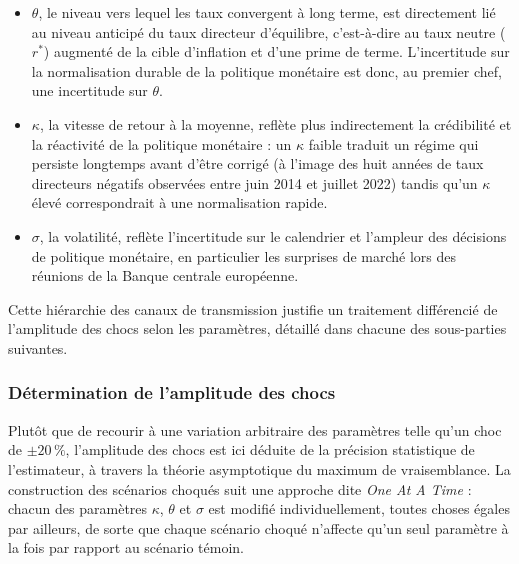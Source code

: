 \begin{itemize}
    \item $\theta$, le niveau vers lequel les taux convergent à long terme, est directement lié au niveau anticipé du taux directeur d'équilibre, c'est-à-dire au taux neutre ($r^*$) augmenté de la cible d'inflation et d'une prime de terme. L'incertitude sur la normalisation durable de la politique monétaire est donc, au premier chef, une incertitude sur $\theta$.
    \item $\kappa$, la vitesse de retour à la moyenne, reflète plus indirectement la crédibilité et la réactivité de la politique monétaire : un $\kappa$ faible traduit un régime qui persiste longtemps avant d'être corrigé (à l'image des huit années de taux directeurs négatifs observées entre juin 2014 et juillet 2022) tandis qu'un $\kappa$ élevé correspondrait à une normalisation rapide.
    \item $\sigma$, la volatilité, reflète l'incertitude sur le calendrier et l'ampleur des décisions de politique monétaire, en particulier les surprises de marché lors des réunions de la Banque centrale européenne.
\end{itemize}

Cette hiérarchie des canaux de transmission justifie un traitement différencié de l'amplitude des chocs selon les paramètres, détaillé dans chacune des sous-parties suivantes.

\subsubsection*{Détermination de l'amplitude des chocs}

Plutôt que de recourir à une variation arbitraire des paramètres telle qu'un choc de $\pm 20\,\%$, l'amplitude des chocs est ici déduite de la précision statistique de l'estimateur, à travers la théorie asymptotique du maximum de vraisemblance. La construction des scénarios choqués suit une approche dite \textit{One At A Time} : chacun des paramètres $\kappa$, $\theta$ et $\sigma$ est modifié individuellement, toutes choses égales par ailleurs, de sorte que chaque scénario choqué n'affecte qu'un seul paramètre à la fois par rapport au scénario témoin.


